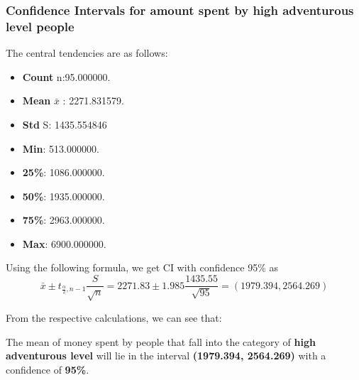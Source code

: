 \documentclass[12pt]{article}
\begin{document}
    \subsubsection{Confidence Intervals for amount spent by high adventurous level people}
        The central tendencies are as follows:
        \begin{itemize}
            \item \textbf{Count} n:95.000000.
            \item \textbf{Mean} $\bar{x}$ : 2271.831579.
            \item \textbf{Std} S: 1435.554846
            \item \textbf{Min}: 513.000000.
            \item \textbf{25\%}: 1086.000000.
            \item \textbf{50\%}: 1935.000000.
            \item \textbf{75\%}: 2963.000000.
            \item \textbf{Max}: 6900.000000.
        \end{itemize}

        Using the following formula, we get CI with confidence 95\% as
        \begin{equation}
        \bar{x} \pm t_{\frac{\alpha}{2}, n-1} \frac{S}{\sqrt{n}} =
        2271.83 \pm 1.985 \frac{1435.55}{\sqrt{95}}  = (1979.394,2564.269)
        \end{equation}

         From the respective calculations, we can see that:
         \item The mean of money spent by people that fall into the category of \textbf{high adventurous level} will lie in the interval \textbf{(1979.394, 2564.269)} with a confidence of \textbf{95\%}.
        
    
\end{document}
